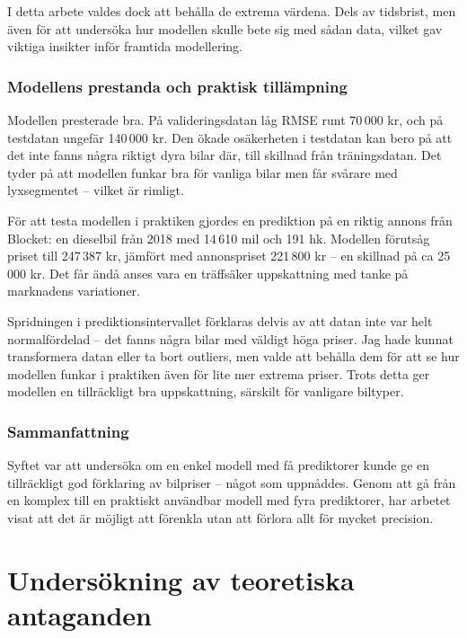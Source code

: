 \documentclass[
  letterpaper,
  DIV=11,
  numbers=noendperiod]{scrreprt}
\begin{document}
I detta arbete valdes dock att behålla de extrema värdena. Dels av
tidsbrist, men även för att undersöka hur modellen skulle bete sig med
sådan data, vilket gav viktiga insikter inför framtida modellering.

\subsection{Modellens prestanda och praktisk
tillämpning}\label{modellens-prestanda-och-praktisk-tilluxe4mpning}

Modellen presterade bra. På valideringsdatan låg RMSE runt 70\,000 kr,
och på testdatan ungefär 140\,000 kr. Den ökade osäkerheten i testdatan
kan bero på att det inte fanns några riktigt dyra bilar där, till
skillnad från träningsdatan. Det tyder på att modellen funkar bra för
vanliga bilar men får svårare med lyxsegmentet -- vilket är rimligt.

För att testa modellen i praktiken gjordes en prediktion på en riktig
annons från Blocket: en dieselbil från 2018 med 14\,610 mil och 191 hk.
Modellen förutsåg priset till 247\,387 kr, jämfört med annonspriset
221\,800 kr -- en skillnad på ca 25\,000 kr. Det får ändå anses vara en
träffsäker uppskattning med tanke på marknadens variationer.

Spridningen i prediktionsintervallet förklaras delvis av att datan inte
var helt normalfördelad -- det fanns några bilar med väldigt höga
priser. Jag hade kunnat transformera datan eller ta bort outliers, men
valde att behålla dem för att se hur modellen funkar i praktiken även
för lite mer extrema priser. Trots detta ger modellen en tillräckligt
bra uppskattning, särskilt för vanligare biltyper.

\subsection{Sammanfattning}\label{sammanfattning}

Syftet var att undersöka om en enkel modell med få prediktorer kunde ge
en tillräckligt god förklaring av bilpriser -- något som uppnåddes.
Genom att gå från en komplex till en praktiskt användbar modell med fyra
prediktorer, har arbetet visat att det är möjligt att förenkla utan att
förlora allt för mycket precision.


\chapter{Undersökning av teoretiska
antaganden}\label{undersuxf6kning-av-teoretiska-antaganden}
\end{document}
